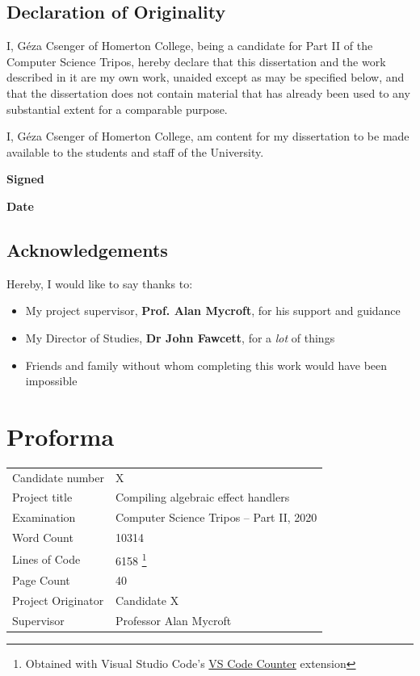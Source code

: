 \documentclass[%
    12pt,
    bibliography=toc,
    listof=leveldown,%
    oneside
]{book}
\begin{document}


\frontmatter

\section*{Declaration of Originality}

I, Géza Csenger of Homerton College, being a candidate for Part II of the 
Computer Science Tripos, hereby declare that this dissertation and the work
described in it are my own work, unaided except as may be specified below, and
that the dissertation does not contain material that has already been used to
any substantial extent for a comparable purpose.

I, Géza Csenger of Homerton College,
am content for my dissertation to be made available to the students and staff
of the University. 

\vspace{1cm}
\textbf{Signed}

\vspace{1cm}
\textbf{Date}

\vspace{3cm}

\section*{Acknowledgements}

Hereby, I would like to say thanks to:
\begin{itemize}
    \item My project supervisor, \textbf{Prof. Alan Mycroft}, for his support
        and guidance
    \item My Director of Studies, \textbf{Dr John Fawcett}, for a \emph{lot} of
        things
    \item Friends and family without whom completing this work would have been
        impossible
\end{itemize}

\newpage

\chapter{Proforma}
\begin{tabularx}{\textwidth}{@{} ll @{}}
Candidate number & X \\
Project title & Compiling algebraic effect handlers \\
Examination & Computer Science Tripos -- Part II, 2020 \\
Word Count & 10314 \\
Lines of Code & 6158
\footnote{Obtained with Visual Studio Code's \href{https://marketplace.visualstudio.com/items?itemName=uctakeoff.vscode-counter}{VS Code Counter} extension} \\
Page Count & 40 \\
Project Originator & Candidate X \\
Supervisor & Professor Alan Mycroft \\
\end{tabularx}
\end{document}
